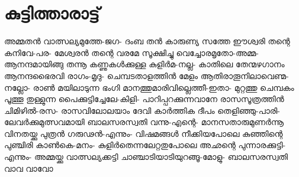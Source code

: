 \section{കുട്ടിത്താരാട്ട്}
\obeylines
\noindent
അമ്മതൻ വാത്സല്യമുത്തേ-ജഗ-
ദംബ തൻ കാരുണ്യ സത്തേ
ഈശ്വരി തന്റെ കനിവേ-പര-
മേശ്വരൻ തന്റെ വരമേ
സൂക്ഷിച്ചു വെച്ചോരമൃതോ-അമ്മ-
ആനന്ദമായിങ്ങു തന്നൂ
കണ്ണുകൾക്കുള്ള കുളിർമ-നല്ല- 
കാതിലെ തേന്മഴഗാനം
ആനന്ദഭൈരവി രാഗം-മൃദു-
ചെമ്പടതാളത്തിൻ മേളം
ആതിരാതൂനിലാവെണ്മ-നല്ലോ-
രാൺ മയിലാടുന്ന ഭംഗി
മാനത്തുമാരിവില്ലെത്തീ-ഇതാ-
മുറ്റത്തു ചെമ്പകം പൂത്തൂ
തുള്ളുന്ന പൈക്കുട്ടിച്ചേലേ-കിളി-
പാറിപ്പറക്കുന്നവാനേ
രാസസൂത്രത്തിൻ ചിമിഴിൽ-രസ-
രാസവിലോലയാം ദേവി
കാർത്തിക ദീപം തെളിഞ്ഞു-പാരി-
ലേവർക്കുമുത്സവമായി
ബാലസരസ്വതി വന്നു-എന്റെ-
മാനസതാരുമുണർന്നൂ
വിനതയ്ക്കു പുത്രൻ ഗരുഢൻ-എന്നും-
വിഷമങ്ങൾ നീക്കിയപോലെ
കുഞ്ഞിന്റെ പുഞ്ചിരി കാൺകെ-മനം-
കുളിർതെന്നലേറ്റതുപോലെ
അഛന്റെ പുന്നാരക്കുട്ടി-എന്നും-
അമ്മയ്ക്കു വാത്സല്യക്കട്ടി
ചാഞ്ചാടിയാടിയുറങ്ങൂ-മോളു-
ബാലസരസ്വതി വാവ വാവോ
